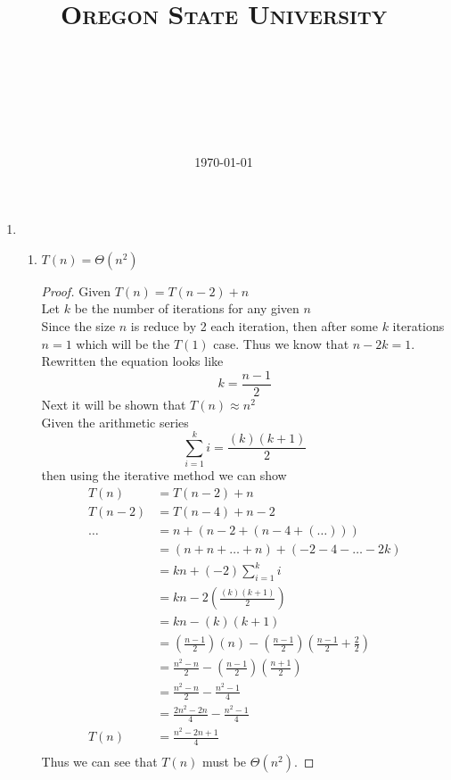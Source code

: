 \documentclass[paper=a4, fontsize=11pt]{scrartcl} %
\title{ 
    \normalfont \normalsize 
    \textsc{Oregon State University} \\ [25pt]
    \horrule{0.5pt} \\[0.4cm] %
    \huge \hwtitle \\ %
    \horrule{2pt} \\[0.5cm] %
}
\author{\name} %
\date{\normalsize\today} %
\numberwithin{equation}{section} %
\numberwithin{figure}{section} %
\numberwithin{table}{section} %
\begin{document}
\maketitle %

\begin{enumerate}
    \item \hfill \\
    \begin{enumerate}
        \item $T(n) = \Theta(n^2)$
        \begin{proof}
            Given $T(n) = T(n - 2) + n$ \\
            Let $k$ be the number of iterations for any given $n$ \\
            Since the size $n$ is reduce by 2 each iteration, then after some 
            $k$ iterations $n = 1$ which will be the $T(1)$ case. Thus we know
            that $n - 2k = 1$. Rewritten the equation looks like 
            \begin{equation}
                k = \frac{ n - 1 }{ 2 }
            \end{equation}
            Next it will be shown that $T(n) \approx n^2$ \\
            Given the arithmetic series
            \begin{equation}
                \sum\limits_{i=1}^k i = \frac{(k)(k + 1)}{2}
            \end{equation}
            then using the iterative method we can show
            \begin{align*}
                T(n) &= T(n - 2) + n \\
                T(n - 2) &= T(n - 4) + n - 2 \\
                \ldots &= n +(n - 2 +(n - 4 + (\ldots))) \\
                &= (n + n + \ldots + n) + (- 2 - 4 - \ldots - 2k) \\
                &= kn + (-2)\sum\limits_{i=1}^k i \\
                &= kn - 2\left(\frac{(k)(k + 1)}{2}\right) \tag{eq. 0.2} \\
                &= kn - (k)(k + 1) \\
                &= \left(\frac{ n - 1 }{ 2 }\right)\left(n\right) - 
                \left(\frac{ n - 1 }{ 2 }\right)\left(\frac{ n - 1 }{ 2 } + 
                \frac{ 2 }{ 2 }\right)  \tag{eq. 0.1}\\
                &= \frac{ n^2 - n }{ 2 } - 
                \left(\frac{ n - 1 }{ 2 }\right)\left(
                \frac{ n + 1 }{ 2 }\right) \\
                &= \frac{ n^2 - n }{ 2 } - \frac{ n^2 - 1 }{ 4 } \\
                &= \frac{ 2n^2 - 2n }{ 4 } - \frac{ n^2 - 1 }{ 4 } \\
                T(n) &= \frac{ n^2 - 2n + 1 }{ 4 } \\
            \end{align*}
            Thus we can see that $T(n)$ must be $\Theta(n^2)$.
        \end{proof}


\end{enumerate}
\end{enumerate}
\end{document}
